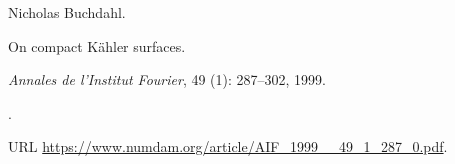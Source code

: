 Nicholas Buchdahl.

\newblock On compact {K\"ahler} surfaces.

\newblock \emph{Annales de l'Institut Fourier}, 49 (1):
  287--302, 1999.

\newblock {}.

\newblock URL \url{https://www.numdam.org/article/AIF_1999__49_1_287_0.pdf}.